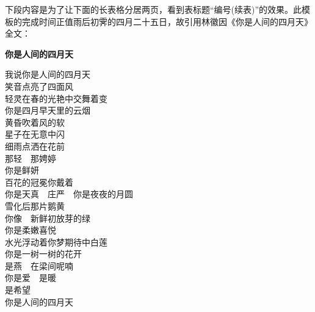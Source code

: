 下段内容是为了让下面的长表格分居两页，看到表标题“编号(续表)”的效果。此模板的完成时间正值雨后初霁的四月二十五日，故引用林徽因《你是人间的四月天》全文：
\begin{center}
\begin{minipage}[c]{0.5\textwidth}

\textbf{你是人间的四月天}

\vspace{12pt}
我说你是人间的四月天\\
笑音点亮了四面风\\
轻灵在春的光艳中交舞着变\\
你是四月早天里的云烟\\
黄昏吹着风的软\\
星子在无意中闪\\
细雨点洒在花前\\
那轻~~那娉婷\\
你是鲜妍\\
百花的冠冕你戴着\\
你是天真~~庄严~~你是夜夜的月圆\\
雪化后那片鹅黄\\
你像~~新鲜初放芽的绿\\
你是柔嫩喜悦\\
水光浮动着你梦期待中白莲\\
你是一树一树的花开\\
是燕~~在梁间呢喃\\
你是爱~~是暖\\
是希望\\
你是人间的四月天
\end{minipage}
\end{center}

